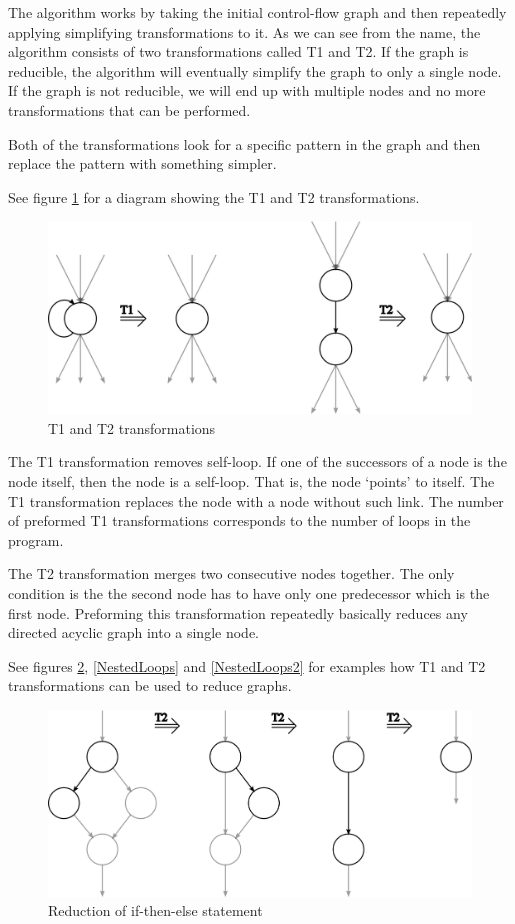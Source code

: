 \documentclass[12pt,twoside,notitlepage]{report}
\begin{document}
The algorithm works by taking the initial control-flow graph
and then repeatedly applying simplifying transformations to it.  
As we can see from the name, the algorithm consists of two
transformations called T1 and T2.
If the graph is reducible, the algorithm will eventually simplify
the graph to only a single node.  If the graph is not reducible,
we will end up with multiple nodes and no more transformations
that can be performed.

Both of the transformations look for a specific pattern in
the graph and then replace the pattern with something simpler.

See figure \ref{T1T2} for a diagram showing the T1 and T2 transformations.

\begin{figure}[tbh]
\centerline{\includegraphics{figs/T1T2.png}}
\caption{\label{T1T2}T1 and T2 transformations}
\end{figure}

The T1 transformation removes self-loop.  If one of the successors
of a node is the node itself, then the node is a self-loop.
That is, the node `points' to itself.  The T1 transformation
replaces the node with a node without such link.
The number of preformed T1 transformations corresponds to the
number of loops in the program.

The T2 transformation merges two consecutive nodes together.
The only condition is the the second node has to have
only one predecessor which is the first node.
Preforming this transformation repeatedly basically reduces
any directed acyclic graph into a single node.

See figures \ref{IfThenElseReduction}, \ref{NestedLoops} and 
\ref{NestedLoops2} for examples how T1 and T2 transformations
can be used to reduce graphs.

\begin{figure}[p]
\centerline{\includegraphics{figs/IfThenElseReduction.png}}
\caption{\label{IfThenElseReduction}Reduction of if-then-else statement}
\end{figure}
\end{document}
